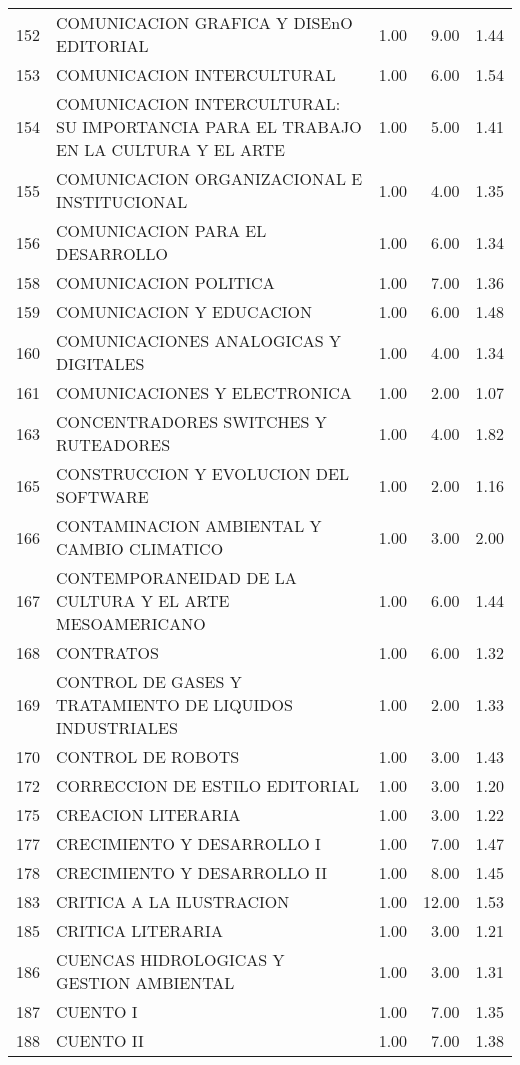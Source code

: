 \documentclass[12pt]{article}
\begin{document}
\begin{table}[ht]
\begin{tabular}{rlrrr}
  152 & COMUNICACION GRAFICA Y DISEnO EDITORIAL & 1.00 & 9.00 & 1.44 \\ 
  153 & COMUNICACION INTERCULTURAL & 1.00 & 6.00 & 1.54 \\ 
  154 & COMUNICACION INTERCULTURAL: SU IMPORTANCIA PARA EL TRABAJO EN LA CULTURA Y EL ARTE & 1.00 & 5.00 & 1.41 \\ 
  155 & COMUNICACION ORGANIZACIONAL E INSTITUCIONAL & 1.00 & 4.00 & 1.35 \\ 
  156 & COMUNICACION PARA EL DESARROLLO & 1.00 & 6.00 & 1.34 \\ 
  158 & COMUNICACION POLITICA & 1.00 & 7.00 & 1.36 \\ 
  159 & COMUNICACION Y EDUCACION & 1.00 & 6.00 & 1.48 \\ 
  160 & COMUNICACIONES ANALOGICAS Y DIGITALES & 1.00 & 4.00 & 1.34 \\ 
  161 & COMUNICACIONES Y ELECTRONICA & 1.00 & 2.00 & 1.07 \\ 
  163 & CONCENTRADORES SWITCHES Y RUTEADORES & 1.00 & 4.00 & 1.82 \\ 
  165 & CONSTRUCCION Y EVOLUCION DEL SOFTWARE & 1.00 & 2.00 & 1.16 \\ 
  166 & CONTAMINACION AMBIENTAL Y CAMBIO CLIMATICO & 1.00 & 3.00 & 2.00 \\ 
  167 & CONTEMPORANEIDAD DE LA CULTURA Y EL ARTE MESOAMERICANO & 1.00 & 6.00 & 1.44 \\ 
  168 & CONTRATOS & 1.00 & 6.00 & 1.32 \\ 
  169 & CONTROL DE GASES Y TRATAMIENTO DE LIQUIDOS INDUSTRIALES & 1.00 & 2.00 & 1.33 \\ 
  170 & CONTROL DE ROBOTS & 1.00 & 3.00 & 1.43 \\ 
  172 & CORRECCION DE ESTILO EDITORIAL & 1.00 & 3.00 & 1.20 \\ 
  175 & CREACION LITERARIA & 1.00 & 3.00 & 1.22 \\ 
  177 & CRECIMIENTO Y DESARROLLO I & 1.00 & 7.00 & 1.47 \\ 
  178 & CRECIMIENTO Y DESARROLLO II & 1.00 & 8.00 & 1.45 \\ 
  183 & CRITICA A LA ILUSTRACION & 1.00 & 12.00 & 1.53 \\ 
  185 & CRITICA LITERARIA & 1.00 & 3.00 & 1.21 \\ 
  186 & CUENCAS HIDROLOGICAS Y GESTION AMBIENTAL & 1.00 & 3.00 & 1.31 \\ 
  187 & CUENTO I & 1.00 & 7.00 & 1.35 \\ 
  188 & CUENTO II & 1.00 & 7.00 & 1.38 \\ 

\end{tabular}
\end{table}
\end{document}
